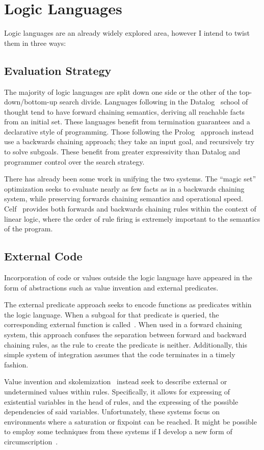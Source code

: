 \section{Logic Languages}
Logic languages are an already widely explored area, however I intend to twist them in three ways:
\subsection{Evaluation Strategy}
The majority of logic languages are split down one side or the other of the top-down/bottom-up search divide.
Languages following in the Datalog~\cite{datalog} school of thought tend to have forward chaining semantics, deriving all reachable facts from an initial set.
These languages benefit from termination guarantees and a declarative style of programming.
Those following the Prolog~\cite{prolog} approach instead use a backwards chaining approach;
they take an input goal, and recursively try to solve subgoals.
These benefit from greater expressivity than Datalog and programmer control over the search strategy.

There has already been some work in unifying the two systems.
The ``magic set''~\cite{magicset} optimization seeks to evaluate nearly as few facts as in a backwards chaining system, while preserving forwards chaining semantics and operational speed.
Celf~\cite{celf} provides both forwards and backwards chaining rules within the context of linear logic, where the order of rule firing is extremely important to the semantics of the program.
\subsection{External Code}
Incorporation of code or values outside the logic language have appeared in the form of abstractions such as value invention and external predicates.

The external predicate approach seeks to encode functions as predicates within the logic language.
When a subgoal for that predicate is queried, the corresponding external function is called~\cite{gnuprolog}.
When used in a forward chaining system, this approach confuses the separation between forward and backward chaining rules, as the rule to create the predicate is neither.
Additionally, this simple system of integration assumes that the code terminates in a timely fashion.

Value invention and skolemization~\cite{Calimeri2007a,Bry2010a} instead seek to describe external or undetermined values within rules.
Specifically, it allows for expressing of existential variables in the head of rules, and the expressing of the possible dependencies of said variables.
Unfortunately, these systems focus on environments where a saturation or fixpoint can be reached.
It might be possible to employ some techniques from these systems if I develop a new form of circumscription~\cite{circumscription}.

